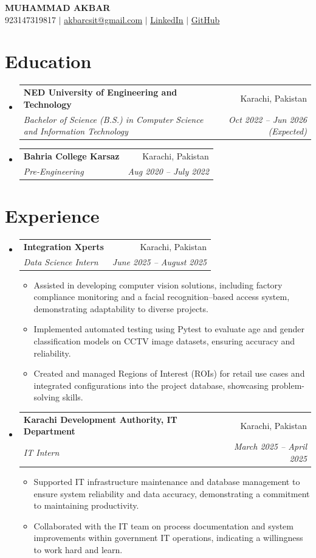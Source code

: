 \documentclass[letterpaper,11pt]{article}
\makeatletter
\newcommand{\resumeItem}[1]{
  \item\small{
    {#1 \vspace{-2pt}}
  }
}
\newcommand{\resumeSubheading}[4]{
  \vspace{-2pt}\item
    \begin{tabular*}{0.97\textwidth}[t]{l@{\extracolsep{\fill}}r}
      \textbf{#1} & #2 \\
      \textit{\small#3} & \textit{\small #4} \\
    \end{tabular*}\vspace{-7pt}
}
\newcommand{\resumeSubHeadingListStart}{\begin{itemize}[leftmargin=0.15in, label={}]}
\newcommand{\resumeSubHeadingListEnd}{\end{itemize}}
\newcommand{\resumeItemListStart}{\begin{itemize}}
\newcommand{\resumeItemListEnd}{\end{itemize}\vspace{-5pt}}
\makeatother
\begin{document}
\begin{center}
    \textbf{\Huge \scshape MUHAMMAD AKBAR} \\ \vspace{1pt}
    \small 923147319817 $|$ \href{mailto:akbarcsit@gmail.com}{\underline{akbarcsit@gmail.com}} $|$ 
    \href{https://www.linkedin.com/in/muhammad-akbar-0b7767270}{\underline{LinkedIn}} $|$
    \href{https://github.com/muakbar04}{\underline{GitHub}}
\end{center}


\section{Education}
  \resumeSubHeadingListStart
        \resumeSubheading
      {NED University of Engineering and Technology}{Karachi, Pakistan}
      {Bachelor of Science (B.S.) in Computer Science and Information Technology}{Oct 2022 – Jun 2026 (Expected)}
        \resumeSubheading
      {Bahria College Karsaz}{Karachi, Pakistan}
      {Pre-Engineering}{Aug 2020 – July 2022}
      \resumeSubHeadingListEnd


\section{Experience}
  \resumeSubHeadingListStart
        \resumeSubheading
      {Integration Xperts}{Karachi, Pakistan}
      {Data Science Intern}{June 2025 – August 2025}
      \resumeItemListStart
                \resumeItem{Assisted in developing computer vision solutions, including factory compliance monitoring and a facial recognition–based access system, demonstrating adaptability to diverse projects.}
                \resumeItem{Implemented automated testing using Pytest to evaluate age and gender classification models on CCTV image datasets, ensuring accuracy and reliability.}
                \resumeItem{Created and managed Regions of Interest (ROIs) for retail use cases and integrated configurations into the project database, showcasing problem-solving skills.}
              \resumeItemListEnd
        \resumeSubheading
      {Karachi Development Authority, IT Department}{Karachi, Pakistan}
      {IT Intern}{March 2025 – April 2025}
      \resumeItemListStart
                \resumeItem{Supported IT infrastructure maintenance and database management to ensure system reliability and data accuracy, demonstrating a commitment to maintaining productivity.}
                \resumeItem{Collaborated with the IT team on process documentation and system improvements within government IT operations, indicating a willingness to work hard and learn.}
              \resumeItemListEnd
      \resumeSubHeadingListEnd
\end{document}
